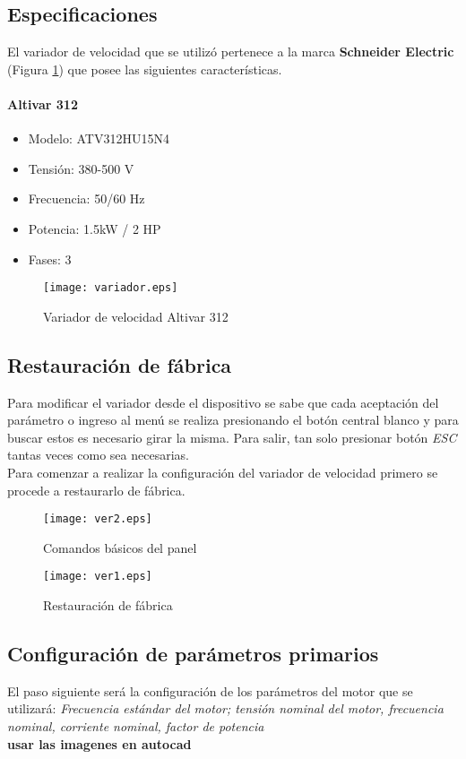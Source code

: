 \subsection{Especificaciones}
El variador de velocidad que se utilizó pertenece a la marca \textbf{Schneider Electric} (Figura \ref{fig:variador}) que posee las siguientes características.
	\paragraph*{Altivar 312}
	\begin{itemize}
		\item 	Modelo: ATV312HU15N4
		\item   Tensión: 380-500 V
		\item 	Frecuencia: 50/60 Hz
		\item 	Potencia: 1.5kW / 2 HP
		\item 	Fases: 3
	\end{itemize}

	\begin{figure}[h!]
		\centering
		\texttt{[image: variador.eps]}
		\caption{Variador de velocidad Altivar 312}
		\label{fig:variador}
	\end{figure}

\subsection{Restauración de fábrica}
	Para modificar el variador desde el dispositivo se sabe que cada aceptación del parámetro o ingreso al menú se realiza presionando el botón central blanco y para buscar estos es necesario girar la misma. Para salir, tan solo presionar botón \textsl{ESC} tantas veces como sea necesarias. \\
	Para comenzar a realizar la configuración del variador de velocidad primero se procede a restaurarlo de fábrica.
	
		\begin{figure}[hbt!]
		\centering
		\texttt{[image: ver2.eps]}
		\caption{Comandos básicos del panel}
		\end{figure}
		
		\begin{figure}[hbt!]
		\centering
		\texttt{[image: ver1.eps]}
		\caption{Restauración de fábrica}
		\end{figure}


\subsection{Configuración de parámetros primarios}
El paso siguiente será la configuración de los parámetros del motor que se utilizará: \textsl{Frecuencia estándar del motor; tensión nominal del motor, frecuencia nominal, corriente nominal, factor de potencia}\\
\textbf{usar las imagenes en autocad}
\newpage